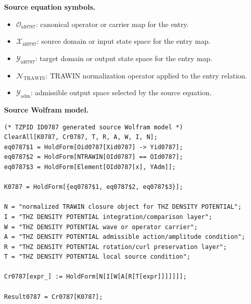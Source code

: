 \begin{minipage}[t]{0.49\linewidth}
\begingroup
\small
\raggedright
\textbf{Source equation symbols.}\par
\begin{itemize}[leftmargin=1.35em,itemsep=1pt,topsep=1pt,parsep=0pt]
    \item $\mathcal{O}_{\mathrm{id0787}}$: canonical operator or carrier map for the entry.
    \item $\mathcal{X}_{\mathrm{id0787}}$: source domain or input state space for the entry map.
    \item $\mathcal{Y}_{\mathrm{id0787}}$: target domain or output state space for the entry map.
    \item $\mathcal{N}_{\mathrm{TRAWIN}}$: TRAWIN normalization operator applied to the entry relation.
    \item $\mathcal{Y}_{\mathrm{adm}}$: admissible output space selected by the source equation.
\end{itemize}
\endgroup
\end{minipage}\hfill
\begin{minipage}[t]{0.47\linewidth}
\begingroup
\scriptsize
\raggedright
\textbf{Source Wolfram model.}\par
\begin{Verbatim}[fontsize=\tiny,breaklines=true,breakanywhere=true]
(* TZPID ID0787 generated source Wolfram model *)
ClearAll[K0787, Cr0787, T, R, A, W, I, N];
eq0787$1 = HoldForm[Oid0787[Xid0787] -> Yid0787];
eq0787$2 = HoldForm[NTRAWIN[OId0787] == OId0787];
eq0787$3 = HoldForm[Element[OId0787[x], YAdm]];

K0787 = HoldForm[{eq0787$1, eq0787$2, eq0787$3}];

N = "normalized TRAWIN closure object for THZ DENSITY POTENTIAL";
I = "THZ DENSITY POTENTIAL integration/comparison layer";
W = "THZ DENSITY POTENTIAL wave or operator carrier";
A = "THZ DENSITY POTENTIAL admissible action/amplitude condition";
R = "THZ DENSITY POTENTIAL rotation/curl preservation layer";
T = "THZ DENSITY POTENTIAL local source condition";

Cr0787[expr_] := HoldForm[N[I[W[A[R[T[expr]]]]]]];

Result0787 = Cr0787[K0787];
\end{Verbatim}
\endgroup
\end{minipage}

